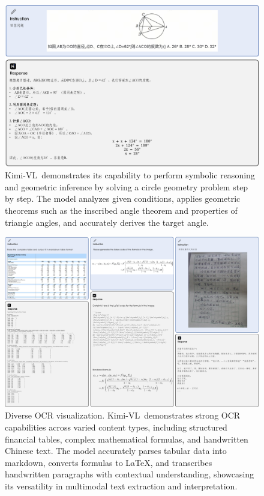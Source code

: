\documentclass{article}
\newcommand{\ourname}{{Kimi-VL}}
\begin{document}
\begin{figure}
    \centering
    \includegraphics[width=1.0\linewidth]{figures/case_math_2.pdf}
    \caption{\ourname~demonstrates its capability to perform symbolic reasoning and geometric inference by solving a circle geometry problem step by step. The model analyzes given conditions, applies geometric theorems such as the inscribed angle theorem and properties of triangle angles, and accurately derives the target angle. }
    \label{fig:outline}
\end{figure}



\begin{figure}
    \centering
    \includegraphics[width=1.0\linewidth]{figures/case_ocr_2.pdf}
    \caption{Diverse OCR visualization. \ourname~demonstrates strong OCR capabilities across varied content types, including structured financial tables, complex mathematical formulas, and handwritten Chinese text. The model accurately parses tabular data into markdown, converts formulas to LaTeX, and transcribes handwritten paragraphs with contextual understanding, showcasing its versatility in multimodal text extraction and interpretation.}
    \label{fig:outline}
\end{figure}
\end{document}

